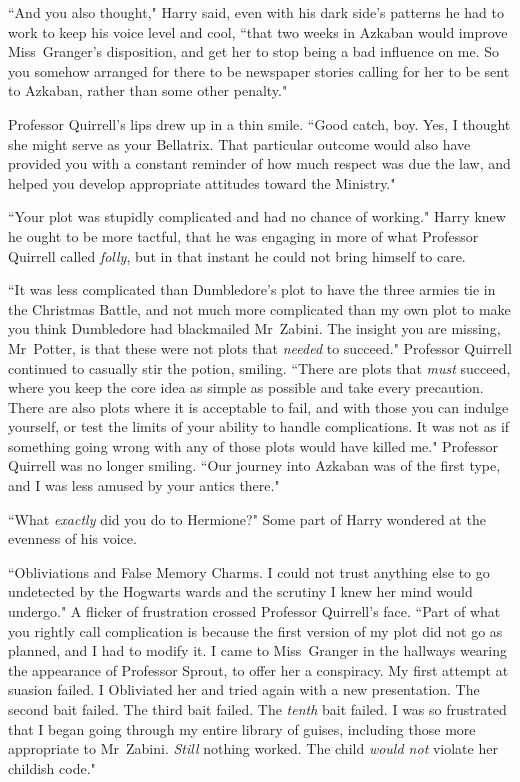 ``And you also thought," Harry said, even with his dark side's patterns he had to work to keep his voice level and cool, ``that two weeks in Azkaban would improve Miss~Granger's disposition, and get her to stop being a bad influence on me. So you somehow arranged for there to be newspaper stories calling for her to be sent to Azkaban, rather than some other penalty."

Professor Quirrell's lips drew up in a thin smile. ``Good catch, boy. Yes, I thought she might serve as your Bellatrix. That particular outcome would also have provided you with a constant reminder of how much respect was due the law, and helped you develop appropriate attitudes toward the Ministry."

``Your plot was stupidly complicated and had no chance of working." Harry knew he ought to be more tactful, that he was engaging in more of what Professor Quirrell called \emph{folly}, but in that instant he could not bring himself to care.

``It was less complicated than Dumbledore's plot to have the three armies tie in the Christmas Battle, and not much more complicated than my own plot to make you think Dumbledore had blackmailed Mr~Zabini. The insight you are missing, Mr~Potter, is that these were not plots that \emph{needed} to succeed." Professor Quirrell continued to casually stir the potion, smiling. ``There are plots that \emph{must} succeed, where you keep the core idea as simple as possible and take every precaution. There are also plots where it is acceptable to fail, and with those you can indulge yourself, or test the limits of your ability to handle complications. It was not as if something going wrong with any of those plots would have killed me." Professor Quirrell was no longer smiling. ``Our journey into Azkaban was of the first type, and I was less amused by your antics there."

``What \emph{exactly} did you do to Hermione?" Some part of Harry wondered at the evenness of his voice.

``Obliviations and False Memory Charms. I could not trust anything else to go undetected by the Hogwarts wards and the scrutiny I knew her mind would undergo." A flicker of frustration crossed Professor Quirrell's face. ``Part of what you rightly call complication is because the first version of my plot did not go as planned, and I had to modify it. I came to Miss~Granger in the hallways wearing the appearance of Professor Sprout, to offer her a conspiracy. My first attempt at suasion failed. I Obliviated her and tried again with a new presentation. The second bait failed. The third bait failed. The \emph{tenth} bait failed. I was so frustrated that I began going through my entire library of guises, including those more appropriate to Mr~Zabini. \emph{Still} nothing worked. The child \emph{would not} violate her childish code."

